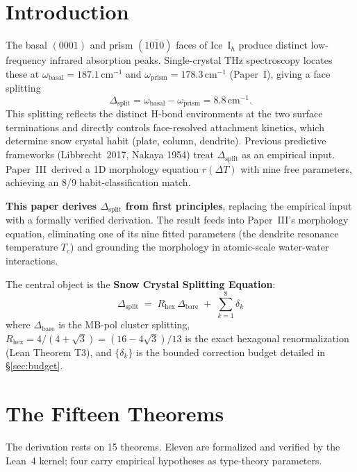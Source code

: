 \documentclass[11pt,a4paper]{article}
\begin{document}
\tableofcontents

\section{Introduction}

The basal $(0001)$ and prism $(10\bar{1}0)$ faces of Ice~I$_h$ produce distinct low-frequency infrared absorption peaks. Single-crystal THz spectroscopy locates these at $\omega_\text{basal} = 187.1\,\mathrm{cm}^{-1}$ and $\omega_\text{prism} = 178.3\,\mathrm{cm}^{-1}$ (Paper~I), giving a face splitting
\begin{equation}
\Delta_\text{split} = \omega_\text{basal} - \omega_\text{prism} = 8.8\,\mathrm{cm}^{-1}.
\end{equation}
This splitting reflects the distinct H-bond environments at the two surface terminations and directly controls face-resolved attachment kinetics, which determine snow crystal habit (plate, column, dendrite). Previous predictive frameworks (Libbrecht~2017, Nakaya 1954) treat $\Delta_\text{split}$ as an empirical input. Paper~III\,\cite{PaperIII} derived a 1D morphology equation $r(\Delta T)$ with nine free parameters, achieving an 8/9 habit-classification match.

\textbf{This paper derives $\Delta_\text{split}$ from first principles}, replacing the empirical input with a formally verified derivation. The result feeds into Paper~III's morphology equation, eliminating one of its nine fitted parameters (the dendrite resonance temperature $T_c$) and grounding the morphology in atomic-scale water-water interactions.

The central object is the \textbf{Snow Crystal Splitting Equation}:
\begin{equation}
\boxed{
\quad
\Delta_\text{split} \;=\; R_\text{hex}\,\Delta_\text{bare} \;+\; \sum_{k=1}^{8} \delta_k
\quad}
\label{eq:main}
\end{equation}
where $\Delta_\text{bare}$ is the MB-pol cluster splitting, $R_\text{hex} = 4/(4+\sqrt{3}) = (16-4\sqrt{3})/13$ is the exact hexagonal renormalization (Lean Theorem T3), and $\{\delta_k\}$ is the bounded correction budget detailed in §\ref{sec:budget}.

\section{The Fifteen Theorems}
\label{sec:theorems}

The derivation rests on 15 theorems. Eleven are formalized and verified by the Lean~4 kernel; four carry empirical hypotheses as type-theory parameters.
\end{document}
